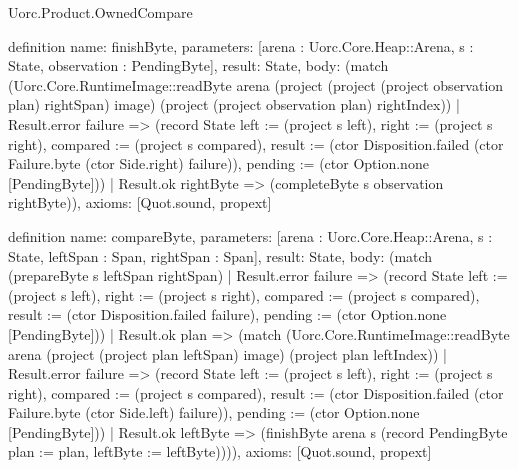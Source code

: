 \begin{lexlean}{Uorc.Product.OwnedCompare}
\begin{semanticmodule}
definition{
  name: finishByte,
  parameters: [arena : Uorc.Core.Heap::Arena, s : State, observation : PendingByte],
  result: State,
  body: (match (Uorc.Core.RuntimeImage::readByte arena (project (project (project observation plan) rightSpan) image) (project (project observation plan) rightIndex))
    | Result.error failure => (record State {left := (project s left), right := (project s right), compared := (project s compared), result := (ctor Disposition.failed (ctor Failure.byte (ctor Side.right) failure)), pending := (ctor Option.none [PendingByte])})
    | Result.ok rightByte => (completeByte s observation rightByte)),
  axioms: [Quot.sound, propext]
}

definition{
  name: compareByte,
  parameters: [arena : Uorc.Core.Heap::Arena, s : State, leftSpan : Span, rightSpan : Span],
  result: State,
  body: (match (prepareByte s leftSpan rightSpan)
    | Result.error failure => (record State {left := (project s left), right := (project s right), compared := (project s compared), result := (ctor Disposition.failed failure), pending := (ctor Option.none [PendingByte])})
    | Result.ok plan => (match (Uorc.Core.RuntimeImage::readByte arena (project (project plan leftSpan) image) (project plan leftIndex))
      | Result.error failure => (record State {left := (project s left), right := (project s right), compared := (project s compared), result := (ctor Disposition.failed (ctor Failure.byte (ctor Side.left) failure)), pending := (ctor Option.none [PendingByte])})
      | Result.ok leftByte => (finishByte arena s (record PendingByte {plan := plan, leftByte := leftByte})))),
  axioms: [Quot.sound, propext]
}


\end{semanticmodule}
\end{lexlean}
